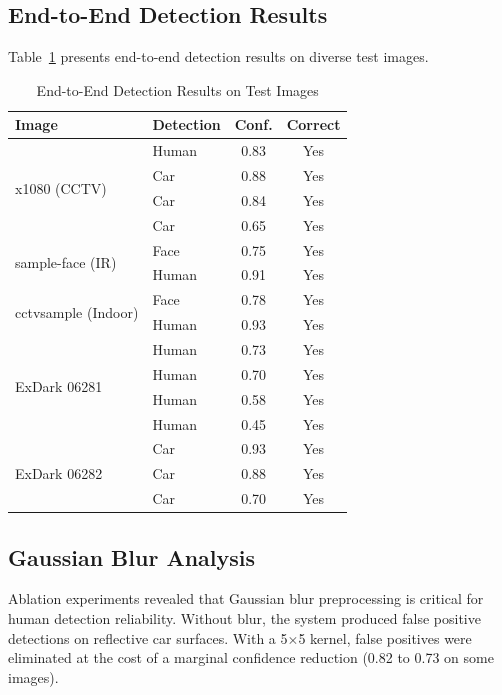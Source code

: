 \documentclass[conference]{IEEEtran}
\begin{document}
\subsection{End-to-End Detection Results}

Table~\ref{tab:e2e} presents end-to-end detection results on diverse test images.

\begin{table}[htbp]
\caption{End-to-End Detection Results on Test Images}
\begin{center}
\begin{tabular}{llcc}
\toprule
\textbf{Image} & \textbf{Detection} & \textbf{Conf.} & \textbf{Correct} \\
\midrule
\multirow{4}{*}{x1080 (CCTV)} & Human & 0.83 & Yes \\
 & Car & 0.88 & Yes \\
 & Car & 0.84 & Yes \\
 & Car & 0.65 & Yes \\
\midrule
\multirow{2}{*}{sample-face (IR)} & Face & 0.75 & Yes \\
 & Human & 0.91 & Yes \\
\midrule
\multirow{2}{*}{cctvsample (Indoor)} & Face & 0.78 & Yes \\
 & Human & 0.93 & Yes \\
\midrule
\multirow{4}{*}{ExDark 06281} & Human & 0.73 & Yes \\
 & Human & 0.70 & Yes \\
 & Human & 0.58 & Yes \\
 & Human & 0.45 & Yes \\
\midrule
\multirow{3}{*}{ExDark 06282} & Car & 0.93 & Yes \\
 & Car & 0.88 & Yes \\
 & Car & 0.70 & Yes \\
\bottomrule
\end{tabular}
\label{tab:e2e}
\end{center}
\end{table}

\subsection{Gaussian Blur Analysis}

Ablation experiments revealed that Gaussian blur preprocessing is critical for human detection reliability. Without blur, the system produced false positive detections on reflective car surfaces. With a 5$\times$5 kernel, false positives were eliminated at the cost of a marginal confidence reduction (0.82 to 0.73 on some images).
\end{document}
